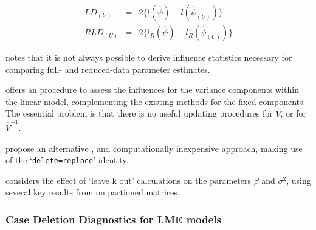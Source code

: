 \documentclass[12pt, a4paper]{report}
\theoremstyle{plain}
\theoremstyle{definition}
\theoremstyle{remark}
\begin{document}
	\begin{eqnarray}
	LD_{(U)} &=& 2\{l(\hat{\psi}) - l( \hat{\psi}_{(U)}) \}\\
	RLD_{(U)} &=& 2\{l_{R}(\hat{\psi}) - l_{R}(\hat{\psi}_{(U)})\}
	\end{eqnarray}
	
	
	
	
	
	
	
	
	
	\citet{schabenberger} notes that it is not always possible to
	derive influence statistics necessary for comparing full- and
	reduced-data parameter estimates. 
	
	
	\citet{HaslettDillane} offers an
	procedure to assess the influences for the variance components
	within the linear model, complementing the existing methods for the fixed components. The essential problem is that there is no useful updating procedures for $\hat{V}$, or for $\hat{V}^{-1}$.
		
		
	\citet{HaslettDillane} propose an alternative , and
	computationally inexpensive approach, making use of the
	`\texttt{delete=replace}' identity.
	
	\citet{Haslett99} considers the effect of `leave k out'
	calculations on the parameters $\beta$ and $\sigma^{2}$, using
	several key results from \citet{HaslettHayes} on partioned
	matrices.
	
	
	
	
	
	
	
	
	


	\subsubsection{Case Deletion Diagnostics for LME models}
	
\end{document}
